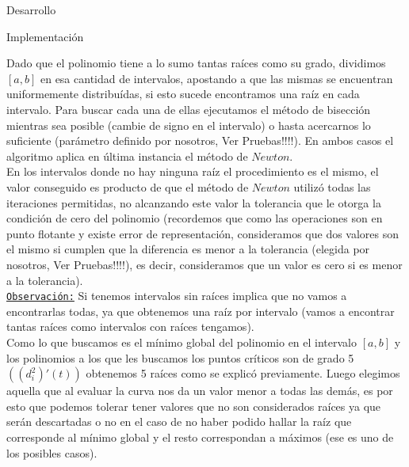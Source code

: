 \begin{section}{Desarrollo}
\begin{subsection}{Implementación}
\begin{itemize}
				Dado que el polinomio tiene a lo sumo tantas raíces como su grado, dividimos $[a,b]$ en esa cantidad de intervalos, apostando a que
				las mismas se encuentran uniformemente distribuídas, si esto sucede encontramos una raíz en cada intervalo. Para buscar cada una de 
				ellas ejecutamos el método de bisección mientras sea posible (cambie de signo en el intervalo) o hasta acercarnos lo suficiente
				(parámetro definido por nosotros, Ver Pruebas!!!!). En ambos casos el algoritmo aplica en última instancia el método de $Newton$.\\
				En los intervalos donde no hay ninguna raíz el procedimiento es el mismo, el valor conseguido es producto de que el método de 
				$Newton$ utilizó todas las iteraciones permitidas, no alcanzando este valor la tolerancia que le otorga la condición de cero del
				polinomio (recordemos que como las operaciones son en punto flotante y existe error de representación, consideramos que dos valores
				son el mismo si cumplen que la diferencia es menor a la tolerancia (elegida por nosotros, Ver Pruebas!!!!), es decir, consideramos que un valor es cero si es menor a la tolerancia).\\
				
				\underline{\texttt{Observación:}} Si tenemos intervalos sin raíces implica que no vamos a encontrarlas todas, ya que obtenemos una raíz por intervalo (vamos a encontrar tantas raíces como intervalos con raíces tengamos).\\
				
				Como lo que buscamos es el mínimo global del polinomio en el intervalo $[a,b]$ y los polinomios a los que les buscamos los puntos críticos son de grado 5 $((d_i^2)'(t))$ obtenemos 5 raíces como se explicó previamente. Luego elegimos aquella que al evaluar la curva nos da un valor menor a todas las demás, es por esto que podemos tolerar tener valores que no son considerados raíces ya que serán descartadas o no en el caso de no haber podido hallar la raíz que corresponde al mínimo global y el resto correspondan a máximos (ese es uno de los posibles casos).
		\end{itemize}
	\end{subsection}
\end{section}